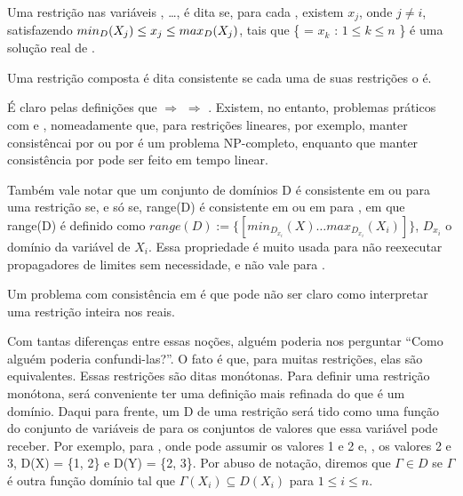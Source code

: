 \begin{definition}
  Uma restrição  nas variáveis , \dots,  é dita
  se, para cada , existem  $x_j$, onde $j \neq i$,
  satisfazendo $min_D(\textit{$X_j$}) \leq x_j \leq max_D(\textit{$X_j$})$,
  tais que \{ = $x_k$ : $1 \leq k \leq n$ \}
  é uma solução real de .

  Uma restrição composta é dita \boundr{} consistente se cada uma de suas restrições o é.
\end{definition}

É claro pelas definições que \boundd{} $\Rightarrow$ \boundz{} $\Rightarrow$ \boundr. Existem, no
entanto, problemas práticos com \boundd{} e \boundz, nomeadamente que, para restrições lineares, por
exemplo, manter consistêncai por \boundd{} ou por \boundz{} é um problema NP-completo, enquanto que
manter consistência por \boundr{} pode ser feito em tempo linear.

Também vale notar que um conjunto de domínios D é consistente em \boundz{} ou \boundr{} para uma
restrição  se, e só se, range(D) é consistente em \boundz{} ou em \boundr{} para
, em que range(D) é definido como $range(D) := \{[min_D_x_i(X) \ldots  max_D_x_i(X_i)]\}$, $D_x_i$ o domínio da
variável de  $X_i$. Essa propriedade é muito usada para não reexecutar propagadores
de limites sem necessidade, e não vale para \boundd{}.

Um problema com consistência em \boundr{} é que pode não ser claro como interpretar uma restrição
inteira nos reais.

Com tantas diferenças entre essas noções, alguém poderia nos perguntar ``Como alguém poderia
confundi-las?''. O fato é que, para muitas restrições, elas são equivalentes. Essas restrições são
ditas monótonas. Para definir uma restrição monótona, será conveniente ter uma definição mais
refinada do que é um domínio. Daqui para frente, um  D de uma restrição
 será tido como uma função do conjunto de variáveis de  para os conjuntos de
valores que essa variável pode receber. Por exemplo, para , onde 
pode assumir os valores 1 e 2 e, , os valores 2 e 3, D(X) = \{1, 2\} e D(Y) = \{2, 3\}. Por
abuso de notação, diremos que $\Gamma \in D$ se $\Gamma$ é outra função domínio tal que $\Gamma(X_i)
\subseteq D(X_i)$ para $1 \leq i \leq n$.

